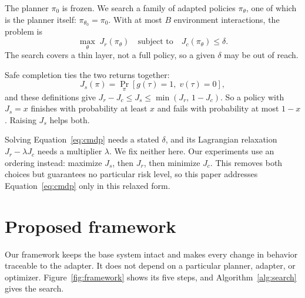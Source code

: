 \documentclass[dvipsnames,format=sigconf]{acmart}
\begin{document}
The planner $\pi_0$ is frozen. We search a family of adapted policies $\pi_\theta$, one of which is
the planner itself: $\pi_{\theta_0}=\pi_0$. With at most $B$ environment interactions, the problem is
\begin{equation}
  \max_{\theta}\; J_r(\pi_\theta)
  \quad\text{subject to}\quad J_c(\pi_\theta)\le\delta .
  \label{eq:cmdp}
\end{equation}
The search covers a thin layer, not a full policy, so a given $\delta$ may be out of reach.

Safe completion ties the two returns together:
\begin{equation}
  J_s(\pi)=\Pr_\pi[g(\tau)=1,\;v(\tau)=0],
  \label{eq:safe}
\end{equation}
and these definitions give $J_r-J_c\le J_s\le\min(J_r,\,1-J_c)$. So a policy with $J_s=x$ finishes
with probability at least $x$ and fails with probability at most $1-x$. Raising $J_s$ helps both.

Solving Equation~\ref{eq:cmdp} needs a stated $\delta$, and its Lagrangian relaxation $J_r-\lambda
J_c$ needs a multiplier $\lambda$. We fix neither here. Our experiments use an ordering instead:
maximize $J_s$, then $J_r$, then minimize $J_c$. This removes both choices but guarantees no
particular risk level, so this paper addresses Equation~\ref{eq:cmdp} only in this relaxed form.

\section{Proposed framework}
\label{sec:framework}

Our framework keeps the base system intact and makes every change in behavior traceable to the
adapter. It does not depend on a particular planner, adapter, or optimizer.
Figure~\ref{fig:framework} shows its five steps, and Algorithm~\ref{alg:search} gives the search.
\end{document}
